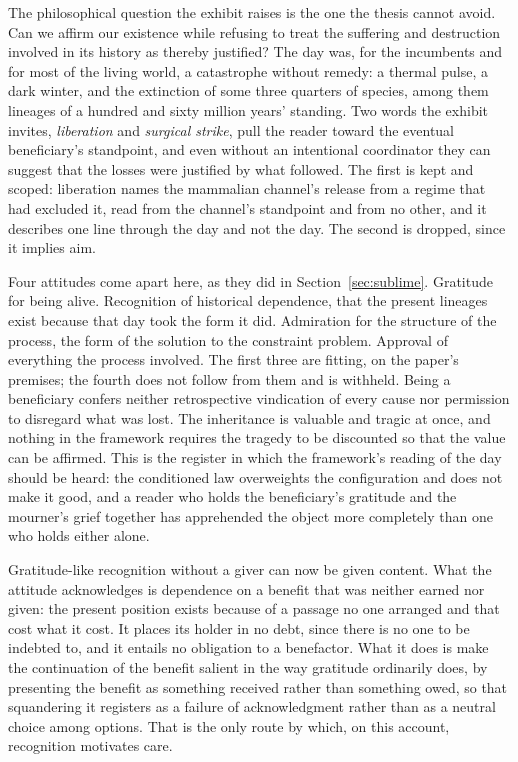 The philosophical question the exhibit raises is the one the thesis cannot
avoid. Can we affirm our existence while refusing to treat the suffering and
destruction involved in its history as thereby justified? The day was, for the
incumbents and for most of the living world, a catastrophe without remedy: a
thermal pulse, a dark winter, and the extinction of some three quarters of
species, among them lineages of a hundred and sixty million years' standing.
Two words the exhibit invites, \emph{liberation} and \emph{surgical strike},
pull the reader toward the eventual beneficiary's standpoint, and even
without an intentional coordinator they can suggest that the losses were
justified by what followed. The first is kept and scoped: liberation names
the mammalian channel's release from a regime that had excluded it, read from
the channel's standpoint and from no other, and it describes one line through
the day and not the day. The second is dropped, since it implies aim.

Four attitudes come apart here, as they did in Section~\ref{sec:sublime}.
Gratitude for being alive. Recognition of historical dependence, that the
present lineages exist because that day took the form it did. Admiration for
the structure of the process, the form of the solution to the constraint
problem. Approval of everything the process involved. The first three are
fitting, on the paper's premises; the fourth does not follow from them and is
withheld. Being a beneficiary confers neither retrospective vindication of
every cause nor permission to disregard what was lost. The inheritance is
valuable and tragic at once, and nothing in the framework requires the tragedy
to be discounted so that the value can be affirmed. This is the register in
which the framework's reading of the day should be heard: the conditioned law
overweights the configuration and does not make it good, and a reader who
holds the beneficiary's gratitude and the mourner's grief together has
apprehended the object more completely than one who holds either alone.

Gratitude-like recognition without a giver can now be given content. What the
attitude acknowledges is dependence on a benefit that was neither earned nor
given: the present position exists because of a passage no one arranged and
that cost what it cost. It places its holder in no debt, since there is no one
to be indebted to, and it entails no obligation to a benefactor. What it does
is make the continuation of the benefit salient in the way gratitude
ordinarily does, by presenting the benefit as something received rather than
something owed, so that squandering it registers as a failure of
acknowledgment rather than as a neutral choice among options. That is the
only route by which, on this account, recognition motivates care.

